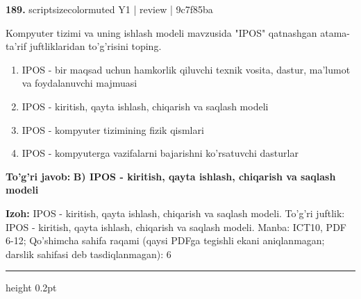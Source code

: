 \documentclass[10pt,a4paper]{article}
\begin{document}
{\bfseries\sffamily\color{ink} 189.} {scriptsizecolor{muted} Y1 | review | 9c7f85ba}
\par
Kompyuter tizimi va uning ishlash modeli mavzusida "IPOS" qatnashgan atama-ta'rif juftliklaridan to'g'risini toping.
\begin{enumerate}[label=\Alph*),leftmargin=9mm]
\item IPOS - bir maqsad uchun hamkorlik qiluvchi texnik vosita, dastur, ma'lumot va foydalanuvchi majmuasi
\item IPOS - kiritish, qayta ishlash, chiqarish va saqlash modeli
\item IPOS - kompyuter tizimining fizik qismlari
\item IPOS - kompyuterga vazifalarni bajarishni ko'rsatuvchi dasturlar
\end{enumerate}
\begin{tcolorbox}[enhanced,breakable,colback=teal!4,colframe=teal!60!black,boxrule=0.45pt,arc=1.2mm,left=2.7mm,right=2.7mm,top=1.8mm,bottom=1.8mm,before skip=2mm,after skip=2mm]
{\bfseries\sffamily\color{teal}To'g'ri javob:} \textbf{B) IPOS - kiritish, qayta ishlash, chiqarish va saqlash modeli}
\par\smallskip
{\bfseries Izoh:} IPOS - kiritish, qayta ishlash, chiqarish va saqlash modeli. To'g'ri juftlik: IPOS - kiritish, qayta ishlash, chiqarish va saqlash modeli. Manba: ICT10, PDF 6-12; Qo'shimcha sahifa raqami (qaysi PDFga tegishli ekani aniqlanmagan; darslik sahifasi deb tasdiqlanmagan): 6
\end{tcolorbox}
\vspace{2mm}\hrule height 0.2pt\vspace{3mm}
\end{document}
